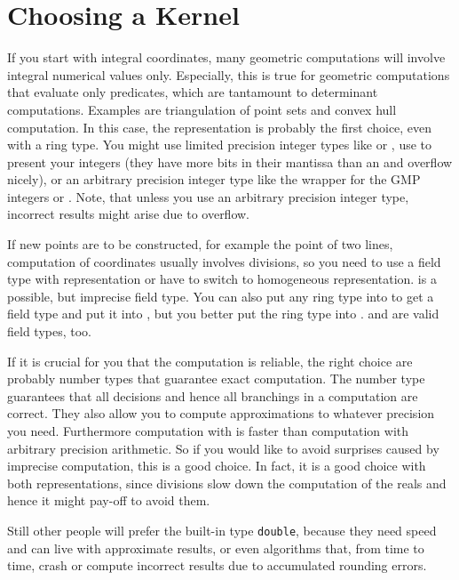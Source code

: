 \section{Choosing a Kernel}
If you start with integral  coordinates, many geometric computations
will involve integral numerical values only. Especially, this is true for
geometric computations that evaluate only predicates, which are tantamount to
determinant computations. Examples are triangulation of point sets and 
convex hull computation.
In this case, the  representation is probably the first choice, even
with a ring type. You might use limited precision integer types like
 or , use  to present your integers (they
have more bits in their mantissa than an  and overflow nicely), or an 
arbitrary precision integer type like the wrapper  for the
GMP integers or . Note, that  unless you use an
arbitrary precision integer type, incorrect results might arise due to
overflow. 

If new points are to be constructed, for example
the  point of two lines, computation of 
 coordinates usually involves divisions, so
you need to use a field type with  representation
or have to switch to homogeneous representation. 
 is a possible, but imprecise field type.
You can also put any ring type into  to get a
field type and put it into , but you better put
the ring type into .
 and  are valid field types, too.

If it is crucial for you that the computation is reliable, 
the right choice are probably number types that guarantee
exact computation. The number type  guarantees
that all decisions and hence all branchings in a computation
are correct. They also allow you to compute approximations to whatever
precision you need. Furthermore computation with 
 is faster than computation with arbitrary precision
arithmetic. So if you would like to avoid surprises caused by imprecise
computation, this is a good choice. In fact, it is a good choice with
both representations, since divisions slow down the computation of
the reals and hence it might pay-off to avoid them.

Still other people will prefer the built-in
type {\tt double}, because they need speed and can live with
approximate results, or even algorithms that, from time to time,
crash or compute incorrect results due to accumulated rounding errors.

